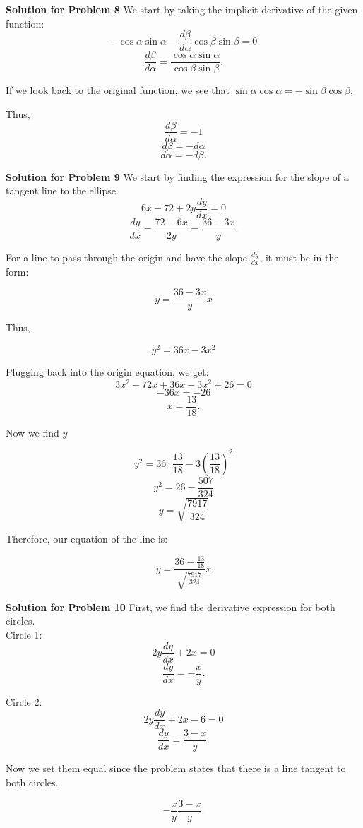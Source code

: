 \documentclass{article}
\newcommand \der {\frac {dy} {dx}}
\newcommand \deralpha {\frac {d\beta} {d\alpha}}
\begin{document}
\vspace{1cm}


\textbf{Solution for Problem 8} We start by taking the implicit derivative of the given function:\\

\[ -\cos\alpha \sin\alpha - \frac {d\beta} {d\alpha} \cos\beta \sin\beta = 0 \]
\[ \deralpha = \frac {\cos\alpha \sin\alpha} {\cos\beta \sin\beta}. \]

If we look back to the original function, we see that $\sin\alpha \cos\alpha = -\sin\beta \cos\beta$,

Thus,
\[ \deralpha = -1 \]
\[ d\beta = -d\alpha \]
\[ \boxed{d\alpha = -d\beta}. \]

\vspace{1cm}


\textbf{Solution for Problem 9} We start by finding the expression for the slope of a tangent line to the ellipse.\\

\[6x - 72 + 2y \der = 0\]
\[\der = \frac {72 - 6x} {2y} = \frac {36 - 3x} {y}.\]

For a line to pass through the origin and have the slope $\der$, it must be in the form:

\[y = \frac {36 - 3x} {y} x\]

Thus,

\[y^2 = 36x - 3x^2\]

Plugging back into the origin equation, we get:
\[3x^2 - 72x + 36x - 3x^2 + 26 = 0\]
\[-36x = -26\]
\[x = \frac {13} {18}.\]

Now we find $y$

\[y^2 = 36 \cdot \frac {13} {18} - 3 \left( \frac {13} {18} \right)^{2}\]
\[y^2 = 26 - \frac {507} {324}\]
\[y = \sqrt{\frac {7917} {324}}\]

Therefore, our equation of the line is:

\[y = \frac {36 - \frac {13} {18}} {\sqrt{\frac {7917} {324}}}x\]

\newpage


\textbf{Solution for Problem 10} First, we find the derivative expression for both circles.\\
Circle 1:
\[2y\der + 2x = 0\]
\[\der = -\frac {x} {y}.\]

Circle 2:
\[2y\der + 2x - 6 = 0\]
\[\der = \frac {3 - x} {y}.\]

Now we set them equal since the problem states that there is a line tangent to both circles.

\[-\frac {x} {y} \frac {3 - x} {y}.\]
\end{document}
